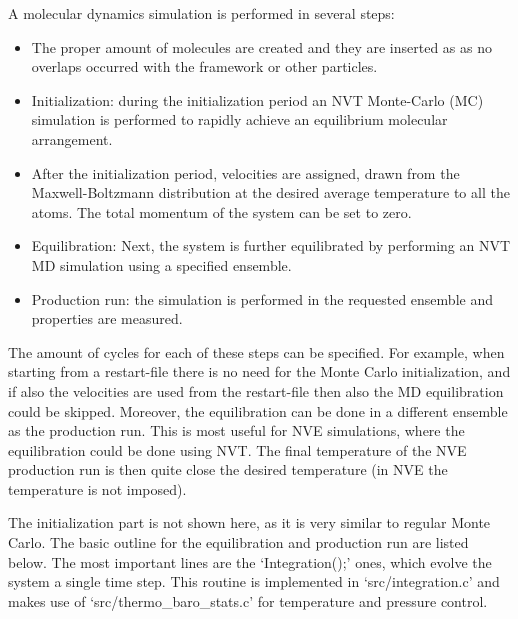 A molecular dynamics simulation is performed in several steps:
\begin{itemize}
  \item{The proper amount of molecules are created and they are inserted as as no overlaps occurred with the framework or other particles.}
  \item{Initialization: during the initialization period an NVT Monte-Carlo (MC) simulation is performed to rapidly achieve
        an equilibrium molecular arrangement.}
  \item{After the initialization period, velocities are assigned, drawn from the Maxwell-Boltzmann
        distribution at the desired average temperature to all the atoms. The total momentum of the system can be set to zero.}
  \item{Equilibration: Next, the system is further equilibrated by performing an NVT MD simulation using a specified ensemble.}
  \item{Production run: the simulation is performed in the requested ensemble and properties are measured.}
\end{itemize}
The amount of cycles for each of these steps can be specified. For example, when starting from a restart-file there is no need for the Monte Carlo initialization,
and if also the velocities are used from the restart-file then also the MD equilibration could be skipped. Moreover, the equilibration can be done in a different
ensemble as the production run. This is most useful for NVE simulations, where the equilibration could be done using NVT. The final temperature of the
NVE production run is then quite close the desired temperature (in NVE the temperature is not imposed).

The initialization part is not shown here, as it is very similar to regular Monte Carlo. The basic outline for the equilibration and production run are listed below.
The most important lines are the `Integration();' ones, which evolve the system a single time step. This routine is implemented in `src/integration.c' and makes use
of `src/thermo\_baro\_stats.c' for temperature and pressure control.


